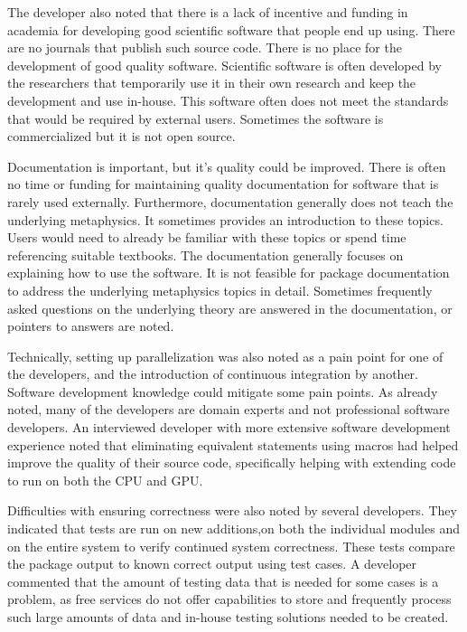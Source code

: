 \documentclass[12pt, notitlepage]{article}
\begin{document}
The developer also noted that there is a lack of incentive and funding in academia for developing good scientific software that people end up using. There are no journals that publish such source code. There is no place for the development of good quality software. Scientific software is often developed by the researchers that temporarily use it in their own research and keep the development and use in-house. This software often does not meet the standards that would be required by external users. Sometimes the software is commercialized but it is not open source. 

Documentation is important, but it's quality could be improved. There is often no time or funding for maintaining quality documentation for software that is rarely used externally. Furthermore, documentation generally does not teach the underlying metaphysics. It sometimes provides an introduction to these topics. Users would need to already be familiar with these topics or spend time referencing suitable textbooks. The documentation generally focuses on explaining how to use the software. It is not feasible for package documentation to address the underlying metaphysics topics in detail. Sometimes frequently asked questions on the underlying theory are answered in the documentation, or pointers to answers are noted.

Technically, setting up parallelization was also noted as a pain point for one of the developers, and the introduction of continuous integration by another. Software development knowledge could mitigate some pain points. As already noted, many of the developers are domain experts and not professional software developers. An interviewed developer with more extensive software development experience noted that eliminating equivalent statements using macros had helped improve the quality of their source code, specifically helping with extending code to run on both the CPU and GPU. 

Difficulties with ensuring correctness were also noted by several developers. They indicated that tests are run on new additions,on  both the individual modules and on the entire system to verify continued system correctness. These tests compare the package output to known correct output using test cases. A developer commented that the amount of testing data that is needed for some cases is a problem, as free services do not offer capabilities to store and frequently process such large amounts of data and in-house testing solutions needed to be created.
\end{document}
